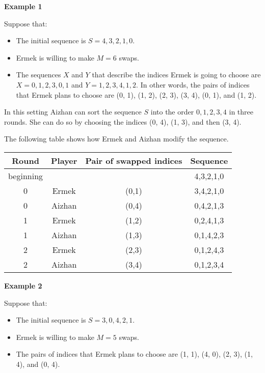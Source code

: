 \textbf{Example 1}

Suppose that:
\begin{itemize}
\item The initial sequence is $S=4,3,2,1,0$.
\item Ermek is willing to make $M=6$ swaps.
\item The sequences $X$ and $Y$ that describe the indices Ermek is going to choose are $X=0,1,2,3,0,1$ and $Y=1,2,3,4,1,2$. In other words, the pairs of indices that Ermek plans to choose are (0, 1), (1, 2), (2, 3), (3, 4), (0, 1), and (1, 2).
\end{itemize}

In this setting Aizhan can sort the sequence $S$ into the order $0,1,2,3,4$ in three rounds. She can do so by choosing the indices (0, 4), (1, 3), and then (3, 4).

The following table shows how Ermek and Aizhan modify the sequence.
\begin{center}
\begin{tabular}{|c|c|c|c|}
\hline
Round & Player & Pair of swapped indices & Sequence\\
\hline
beginning & & & 4,3,2,1,0\\
\hline
0 & Ermek & (0,1) & 3,4,2,1,0\\ 
\hline
0 & Aizhan & (0,4) & 0,4,2,1,3\\
\hline
1 & Ermek & (1,2) & 0,2,4,1,3\\
\hline
1 & Aizhan & (1,3) & 0,1,4,2,3\\
\hline
2 & Ermek & (2,3) & 0,1,2,4,3\\
\hline
2 & Aizhan & (3,4) & 0,1,2,3,4\\
\hline
\end{tabular}
\end{center}

\textbf{Example 2}

Suppose that:
\begin{itemize}
\item The initial sequence is $S=3,0,4,2,1$.
\item Ermek is willing to make $M=5$ swaps.
\item The pairs of indices that Ermek plans to choose are (1, 1), (4, 0), (2, 3), (1, 4), and (0, 4).
\end{itemize}

